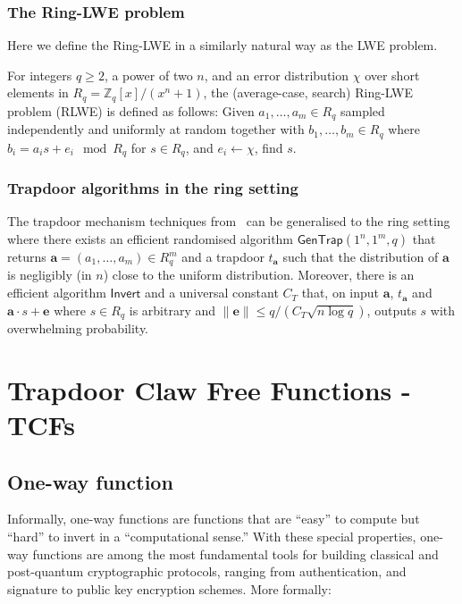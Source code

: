\documentclass[cryptography,review,submit,pdftex,moreauthors,amsmath,amssymb,aps,strict]{Definitions/mdpi}
\begin{document}
\subsubsection{The Ring-LWE problem}
Here we define the Ring-LWE in a similarly natural way as the LWE problem.

For integers $q\geq 2$, a power of two $n$, and an error distribution $\chi$ over short elements in $R_q = \mathbb{Z}_q[x]/(x^n+1)$, the (average-case, search) Ring-LWE problem (RLWE) is defined as follows: 
Given $a_1,\dots, a_{m}\in R_q$ sampled independently and uniformly at random together with $b_1,\dots,b_{m}\in R_q$ where $b_i=a_i s + e_i \mod R_q$ for $s\in R_q$, and $e_i\gets \chi$, find $s$.


\subsubsection{Trapdoor algorithms in the ring setting}

The trapdoor mechanism techniques from~\cite{MP12} can be generalised to the ring setting where there exists an efficient randomised algorithm $\mathsf{GenTrap}(1^n,1^m,q)$ that returns $\mathbf{a}=(a_1,\dots,a_m)\in R^{m}_q$ and a trapdoor $t_{\mathbf{a}}$ such that the distribution of $\mathbf{a}$ is negligibly (in $n$) close to the uniform distribution. Moreover, there is an efficient algorithm $\mathsf{Invert}$ and a universal constant $C_T$ that, on input $\mathbf{a}$, $t_{\mathbf{a}}$ and $\mathbf{a}\cdot s+\mathbf{e}$ where $s \in R_q$ is arbitrary and $\|\mathbf{e}\|\leq q/(C_T\sqrt{n\log q})$, outputs $s$ with overwhelming probability.

\section{Trapdoor Claw Free Functions - TCFs} \label{tfcs}

\subsection{One-way function}
Informally, one-way functions are functions that are ``easy'' to compute but ``hard'' to invert in a ``computational sense.'' With these special properties, one-way functions are among the most fundamental tools for building classical and post-quantum cryptographic protocols, ranging from authentication, and signature to public key encryption schemes. More formally:
\end{document}
